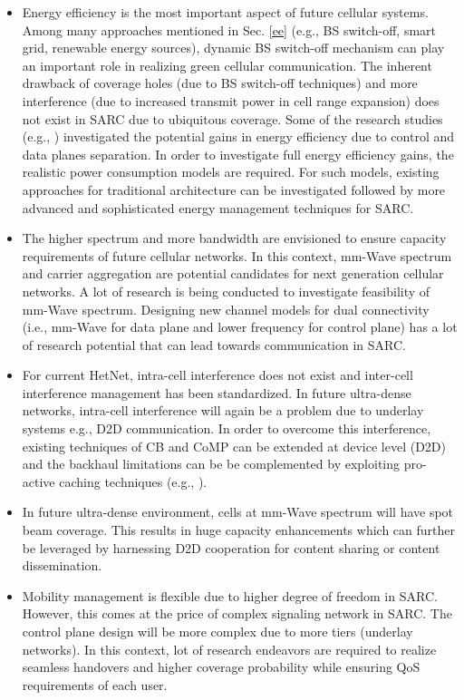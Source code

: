 \documentclass[article,10pt,twocolumn]{IEEEtran}
\begin{document}
\begin{itemize}
  \item Energy efficiency is the most important aspect of future cellular systems. Among many approaches mentioned in Sec. \ref{ee} (e.g., BS switch-off, smart grid, renewable energy sources), dynamic BS switch-off mechanism can play an important role in realizing green cellular communication. The inherent drawback of coverage holes (due to BS switch-off techniques) and more interference (due to increased transmit power in cell range expansion) does not exist in SARC due to ubiquitous coverage. Some of the research studies (e.g., \citep{6477646, 6554746,7037473}) investigated the potential gains in energy efficiency due to control and data planes separation. In order to investigate full energy efficiency gains, the realistic power consumption models are required. For such models, existing approaches for traditional architecture can be investigated followed by more advanced and sophisticated energy management techniques for SARC.
  \item The higher spectrum and more bandwidth are envisioned to ensure capacity requirements of future cellular networks. In this context, mm-Wave spectrum and carrier aggregation are potential candidates for next generation cellular networks. A lot of research is being conducted to investigate feasibility of mm-Wave spectrum. Designing new channel models for dual connectivity (i.e., mm-Wave for data plane and lower frequency for control plane) has a lot of research potential that can lead towards communication in SARC.
  \item For current HetNet, intra-cell interference does not exist and inter-cell interference management has been standardized. In future ultra-dense networks, intra-cell interference will again be a problem due to underlay systems e.g., D2D communication. In order to overcome this interference, existing techniques of CB and CoMP can be extended at device level (D2D) and the backhaul limitations can be be complemented by exploiting pro-active caching techniques (e.g., \citep{6601672, 6665021, 6948325}). 
  \item In future ultra-dense environment, cells at mm-Wave spectrum will have spot beam coverage. This results in huge capacity enhancements which can further be leveraged by harnessing D2D cooperation for content sharing or content dissemination.
  \item Mobility management is flexible due to higher degree of freedom in SARC. However, this comes at the price of complex signaling network in SARC. The control plane design will be more complex due to more tiers (underlay networks). In this context, lot of research endeavors are required to realize seamless handovers and higher coverage probability while ensuring QoS requirements of each user.
\end{itemize}
\balance
\end{document}
